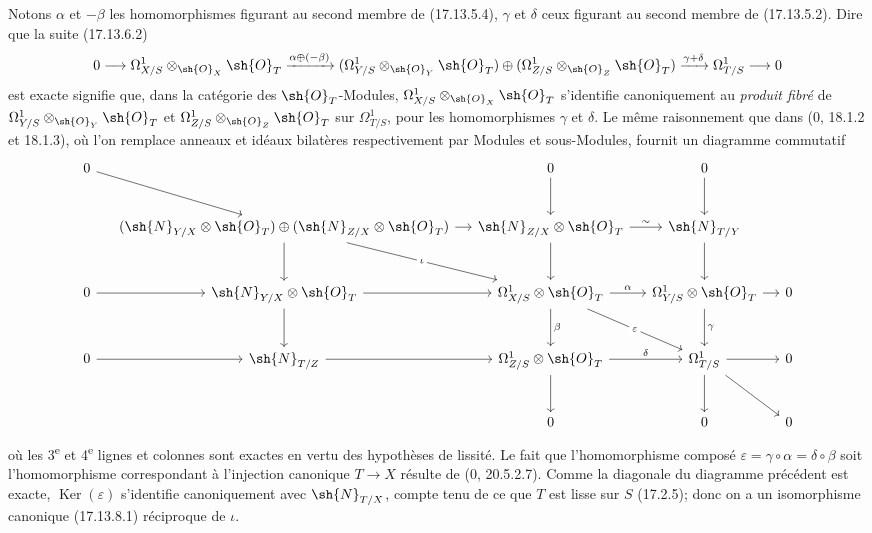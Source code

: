 Notons $\alpha$ et $-\beta$ les homomorphismes figurant au second membre de (17.13.5.4), $\gamma$ et $\delta$ ceux figurant au second membre de (17.13.5.2). Dire que la suite (17.13.6.2)
\[
0\to\Omega^1_{X/S}\otimes_{\sh{O}_X}\sh{O}_T
\xrightarrow{\alpha\oplus(-\beta)}
(\Omega^1_{Y/S}\otimes_{\sh{O}_Y}\sh{O}_T)\oplus
(\Omega^1_{Z/S}\otimes_{\sh{O}_Z}\sh{O}_T)
\xrightarrow{\gamma+\delta}\Omega^1_{T/S}\to0
\]
est exacte signifie que, dans la catégorie des $\sh{O}_T$-Modules, $\Omega^1_{X/S}\otimes_{\sh{O}_X}\sh{O}_T$ s'identifie canoniquement au \emph{produit fibré} de $\Omega^1_{Y/S}\otimes_{\sh{O}_Y}\sh{O}_T$ et $\Omega^1_{Z/S}\otimes_{\sh{O}_Z}\sh{O}_T$ sur $\Omega^1_{T/S}$, pour les homomorphismes $\gamma$ et $\delta$. Le même raisonnement que dans (0, 18.1.2 et 18.1.3), où l'on remplace anneaux et idéaux bilatères respectivement par Modules et sous-Modules, fournit un diagramme commutatif
{\scriptsize
\[
\begin{tikzcd}[column sep=small,row sep=large]
0 \ar[dr] & & 0 \ar[d] & 0 \ar[d] & \\
& (\sh{N}_{Y/X}\otimes\sh{O}_T)\oplus(\sh{N}_{Z/X}\otimes\sh{O}_T)
  \ar[r] \ar[d] \ar[dr,"\iota" description]
& \sh{N}_{Z/X}\otimes\sh{O}_T \ar[r,"\sim"] \ar[d]
& \sh{N}_{T/Y} \ar[d] & \\
0 \ar[r] & \sh{N}_{Y/X}\otimes\sh{O}_T \ar[r] \ar[d]
& \Omega^1_{X/S}\otimes\sh{O}_T \ar[r,"\alpha"] \ar[d,"\beta"] \ar[dr,"\varepsilon" description]
& \Omega^1_{Y/S}\otimes\sh{O}_T \ar[r] \ar[d,"\gamma"] & 0\\
0 \ar[r] & \sh{N}_{T/Z} \ar[r]
& \Omega^1_{Z/S}\otimes\sh{O}_T \ar[r,"\delta"] \ar[d]
& \Omega^1_{T/S} \ar[r] \ar[d] \ar[dr] & 0\\
& & 0 & 0 & 0
\end{tikzcd}
\]
}
où les 3\textsuperscript{e} et 4\textsuperscript{e} lignes et colonnes sont exactes en vertu des hypothèses de lissité. Le fait que l'homomorphisme composé $\varepsilon=\gamma\circ\alpha=\delta\circ\beta$ soit l'homomorphisme correspondant à l'injection canonique $T\to X$ résulte de (0, 20.5.2.7). Comme la diagonale du diagramme précédent est exacte, $\operatorname{Ker}(\varepsilon)$ s'identifie canoniquement avec $\sh{N}_{T/X}$, compte tenu de ce que $T$ est lisse sur $S$ (17.2.5); donc on a un isomorphisme canonique (17.13.8.1) réciproque de $\iota$.

